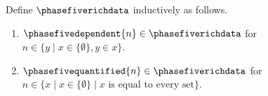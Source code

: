 \begin{datatype}\label{phase5_rich_data}
    Define $\phasefiverichdata$ inductively as follows.
    \begin{enumerate}
        \item $\phasefivedependent{n} \in \phasefiverichdata$ for
            $n \in \{y \mid x \in \{\emptyset\}, y \in x\}$.
        \item $\phasefivequantified{n} \in \phasefiverichdata$ for
            $n \in \{x \mid x \in \{\emptyset\} \mid
                \text{$x$ is equal to every set}\}$.
    \end{enumerate}
\end{datatype}
